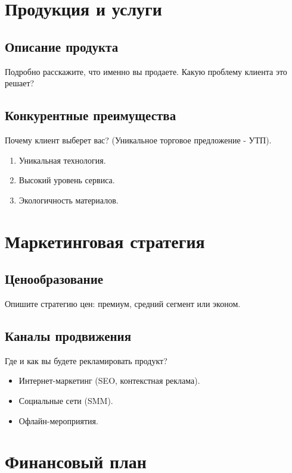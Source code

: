 \documentclass[a4paper,12pt]{article}
\begin{document}
\newpage
\section{Продукция и услуги}

\subsection{Описание продукта}
Подробно расскажите, что именно вы продаете. Какую проблему клиента это решает?

\subsection{Конкурентные преимущества}
Почему клиент выберет вас? (Уникальное торговое предложение - УТП).
\begin{enumerate}
    \item Уникальная технология.
    \item Высокий уровень сервиса.
    \item Экологичность материалов.
\end{enumerate}

\newpage
\section{Маркетинговая стратегия}

\subsection{Ценообразование}
Опишите стратегию цен: премиум, средний сегмент или эконом.

\subsection{Каналы продвижения}
Где и как вы будете рекламировать продукт?
\begin{itemize}
    \item Интернет-маркетинг (SEO, контекстная реклама).
    \item Социальные сети (SMM).
    \item Офлайн-мероприятия.
\end{itemize}

\newpage
\section{Финансовый план}
\end{document}
